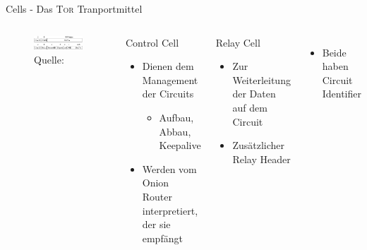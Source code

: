 \documentclass{beamer}
\begin{document}
\begin{frame}{Cells - Das \textsc{Tor} Tranportmittel}
 
  \begin{columns}[c]
  
    \begin{figure}
      \includegraphics[width=\textwidth]{pics/cell}
      \caption{Quelle: \cite{tor}}
    \end{figure}
    
    \begin{block}{Control Cell}
      \begin{itemize}
	\item Dienen dem Management der Circuits
	\begin{itemize}
	  \item Aufbau, Abbau, Keepalive
	\end{itemize}
	\item Werden vom Onion Router interpretiert, der sie empfängt
      \end{itemize}
    \end{block} 
    \begin{block}{Relay Cell}
      \begin{itemize}
	\item Zur Weiterleitung der Daten auf dem Circuit
	\item Zusätzlicher Relay Header
      \end{itemize}
    \end{block} 
  
    \begin{itemize}
      \item Beide haben Circuit Identifier
    \end{itemize}
    
  \end{columns}
\end{frame}
\end{document}
